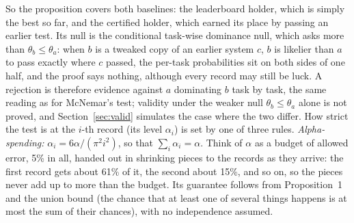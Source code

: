 \documentclass[11pt]{article}
\begin{document}
So the proposition covers both baselines: the leaderboard holder, which is simply the best so far, and the certified holder, which earned its place by passing an earlier test.
Its null is the conditional task-wise dominance null, which asks more than $\theta_b\le\theta_a$: when $b$ is a tweaked copy of an earlier system $c$, $b$ is likelier than $a$ to pass exactly where $c$ passed, the per-task probabilities sit on both sides of one half, and the proof says nothing, although every record may still be luck.
A rejection is therefore evidence against $a$ dominating $b$ task by task, the same reading as for McNemar's test; validity under the weaker null $\theta_b\le\theta_a$ alone is not proved, and Section~\ref{sec:valid} simulates the case where the two differ.
How strict the test is at the $i$-th record (its level $\alpha_i$) is set by one of three rules.
\emph{Alpha-spending:} $\alpha_i=6\alpha/(\pi^2 i^2)$, so that $\sum_i\alpha_i=\alpha$.
Think of $\alpha$ as a budget of allowed error, 5\% in all, handed out in shrinking pieces to the records as they arrive: the first record gets about 61\% of it, the second about 15\%, and so on, so the pieces never add up to more than the budget.
Its guarantee follows from Proposition~1 and the union bound (the chance that at least one of several things happens is at most the sum of their chances), with no independence assumed.
\end{document}
